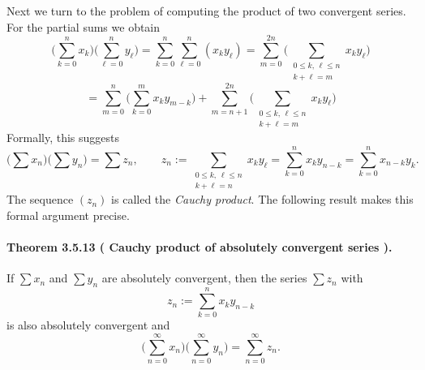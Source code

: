 \documentclass[12pt]{article}
\newcommand{\NumberedTheorem}[3]{%
\paragraph*{Theorem #1 ( #2 ).} #3\par}
\begin{document}
	Next we turn to the problem of computing the product of two convergent series. For the partial sums we obtain
	\[
		\Bigg( \sum_{k=0}^{n} x_k \Bigg) \Bigg( \sum_{\ell=0}^{n} y_\ell \Bigg)
			= \sum_{k=0}^{n} \sum_{\ell=0}^{n} (x_k y_\ell)
			= \sum_{m=0}^{2n} \Bigg( \sum_{\substack{0\le k,\,\ell\le n\\ k+\ell = m}} x_k y_\ell \Bigg)
	\]
	\[
			= \sum_{m=0}^{n} \Bigg( \sum_{k=0}^{m} x_k y_{m-k} \Bigg)
				+ \sum_{m=n+1}^{2n} \Bigg( \sum_{\substack{0\le k,\,\ell\le n\\ k+\ell = m}} x_k y_\ell \Bigg) \tag{$\ast$}
	\]
	Formally, this suggests
	\[
		\Big( \sum x_n \Big) \Big( \sum y_n \Big) = \sum z_n, \qquad
		z_n := \sum_{\substack{0\le k,\,\ell\le n\\ k+\ell = n}} x_k y_\ell = \sum_{k=0}^{n} x_k y_{n-k} = \sum_{k=0}^{n} x_{n-k} y_k.
	\]
	The sequence $(z_n)$ is called the \emph{Cauchy product}. The following result makes this formal argument precise.

	\NumberedTheorem{3.5.13}{Cauchy product of absolutely convergent series}{If $\sum x_n$ and $\sum y_n$ are absolutely convergent, then the series $\sum z_n$ with
	\[
		z_n := \sum_{k=0}^{n} x_k y_{n-k}
	\]
	is also absolutely convergent and
	\[
		\Big( \sum_{n=0}^{\infty} x_n \Big) \Big( \sum_{n=0}^{\infty} y_n \Big) = \sum_{n=0}^{\infty} z_n.
	\]
}
\end{document}

